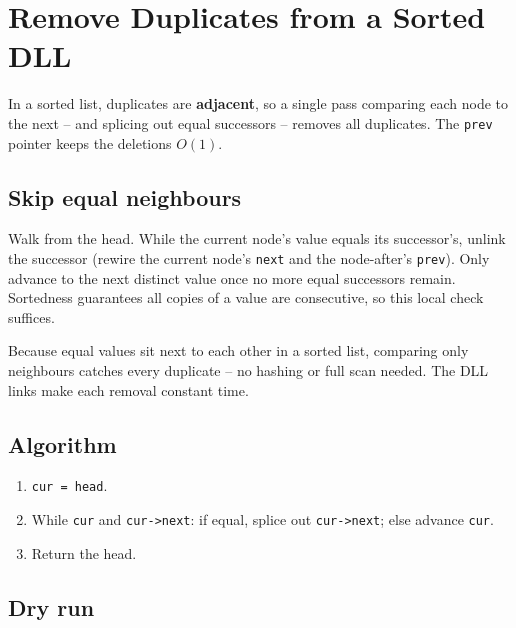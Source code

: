 \section{Remove Duplicates from a Sorted DLL}
\label{sec:ll-remove-duplicates-dll}


\begin{patternbox}
In a sorted list, duplicates are \textbf{adjacent}, so a single pass
comparing each node to the next -- and splicing out equal successors --
removes all duplicates. The \texttt{prev} pointer keeps the deletions
$O(1)$.
\end{patternbox}

\subsection*{Skip equal neighbours}

Walk from the head. While the current node's value equals its successor's,
unlink the successor (rewire the current node's \texttt{next} and the
node-after's \texttt{prev}). Only advance to the next distinct value once no
more equal successors remain. Sortedness guarantees all copies of a value
are consecutive, so this local check suffices.

\begin{ideabox}
Because equal values sit next to each other in a sorted list, comparing
only neighbours catches every duplicate -- no hashing or full scan needed.
The DLL links make each removal constant time.
\end{ideabox}

\subsection*{Algorithm}

\begin{enumerate}
  \item \texttt{cur = head}.
  \item While \texttt{cur} and \texttt{cur->next}: if equal, splice out
        \texttt{cur->next}; else advance \texttt{cur}.
  \item Return the head.
\end{enumerate}

\subsection*{Dry run}

